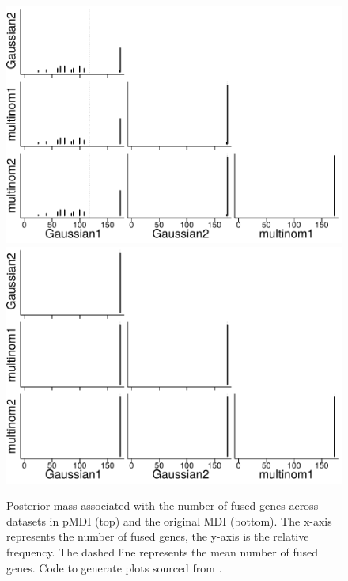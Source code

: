\documentclass[10pt,a4paper]{article}
\begin{document}
\begin{center}
\begin{figure}
\includegraphics{Plots/hist_final.pdf}
\includegraphics{Plots/MDI_hist.pdf}

\caption{Posterior mass associated with the number of fused genes across datasets in pMDI (top) and the original MDI (bottom). The x-axis represents the number of fused genes, the y-axis is the relative frequency. The dashed line represents the mean number of fused genes. Code to generate plots sourced from \cite{mdipp}.}
\label{fig:hist}
\end{figure}
\end{center}
\end{document}
